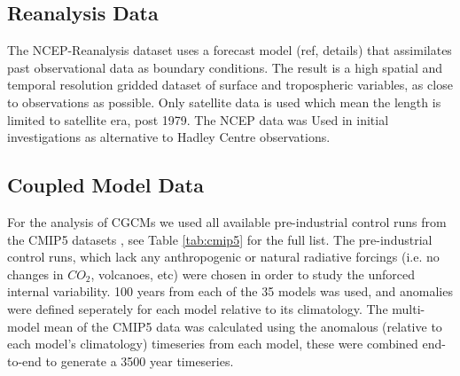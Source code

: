 \subsection{Reanalysis Data}

The NCEP-Reanalysis dataset uses a forecast model (ref, details) that 
assimilates past observational data as boundary conditions. The result is a high 
spatial and temporal resolution gridded dataset of surface and tropospheric 
variables, as close to observations as possible.  Only satellite data is used 
which mean the length is limited to satellite era, post 1979. The NCEP data was 
Used in initial investigations as alternative to Hadley Centre observations.

\subsection{Coupled Model Data}

For the analysis of CGCMs we used all available pre-industrial control runs from 
the CMIP5 datasets \citep{Taylor2012}, see Table \ref{tab:cmip5} for the full 
list. The pre-industrial control runs, which lack any anthropogenic or natural 
radiative forcings (i.e. no changes in $CO_2$, volcanoes, etc)  were chosen in 
order to study the unforced internal variability. 100 years from each of the 35 
models was used, and anomalies were defined seperately for each model relative 
to its climatology. The multi-model mean of the CMIP5 data was calculated using 
the anomalous (relative to each model’s climatology) timeseries from each model, 
these were combined end-to-end to generate a 3500 year timeseries. 

